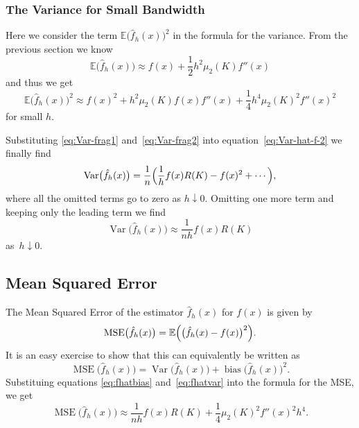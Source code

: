 \documentclass[
  a4paper,
]{article}
\theoremstyle{definition}
\theoremstyle{definition}
\theoremstyle{definition}
\theoremstyle{definition}
\theoremstyle{remark}
\begin{document}
\hypertarget{the-variance-for-small-bandwidth}{%
\subsubsection{The Variance for Small Bandwidth}\label{the-variance-for-small-bandwidth}}

Here we consider the term \(\mathbb{E}\bigl( \hat f_h(x) \bigr)^2\) in the formula
for the variance. From the previous section we know
\begin{equation*}
    \mathbb{E}\bigl( \hat f_h(x) \bigr)
    \approx f(x) + \frac12 h^2 \mu_2(K) f''(x)
\end{equation*}
and thus we get
\begin{equation}
    \mathbb{E}\bigl( \hat f_h(x) \bigr)^2
    \approx f(x)^2 + h^2 \mu_2(K) f(x) f''(x) + \frac14 h^4 \mu_2(K)^2 f''(x)^2
                             \label{eq:Var-frag2}
\end{equation}
for small \(h\).

Substituting \eqref{eq:Var-frag1} and~\eqref{eq:Var-frag2} into
equation~\eqref{eq:Var-hat-f-2} we finally find
\begin{equation*}
  \mathop{\mathrm{Var}}\bigl( \hat f_h(x) \bigr)
  = \frac{1}{n} \Bigl(
    \frac{1}{h} f(x) R(K)
    - f(x)^2
    + \cdots
   \Bigr),
\end{equation*}
where all the omitted terms go to zero as \(h \downarrow 0\).
Omitting one more term and keeping only the leading term
we find
\begin{equation}
  \mathop{\mathrm{Var}}\bigl( \hat f_h(x) \bigr)
  \approx \frac{1}{nh} f(x) R(K)     \label{eq:fhatvar}
\end{equation}
as~\(h\downarrow 0\).

\hypertarget{mean-squared-error}{%
\subsection{Mean Squared Error}\label{mean-squared-error}}

The Mean Squared Error of the estimator \(\hat f_h(x)\) for \(f(x)\) is given
by
\begin{equation*}
  \mathop{\mathrm{MSE}}\nolimits\bigl( \hat f_h(x) \bigr)
  = \mathbb{E}\Bigl( \bigl( \hat f_h(x) - f(x) \bigr)^2 \Bigr).
\end{equation*}
It is an easy exercise to show that this can equivalently be written as
\begin{equation*}
  \mathop{\mathrm{MSE}}\nolimits\bigl( \hat f_h(x) \bigr)
  = \mathop{\mathrm{Var}}\bigl( \hat f_h(x) \bigr) + \mathop{\mathrm{bias}}\bigl( \hat f_h(x) \bigr)^2.
\end{equation*}
Substituing equations \eqref{eq:fhatbias} and~\eqref{eq:fhatvar} into
the formula for the MSE, we get
\begin{equation}
  \mathop{\mathrm{MSE}}\nolimits\bigl( \hat f_h(x) \bigr)
  \approx \frac{1}{nh} f(x) R(K) + \frac14 \mu_2(K)^2 f''(x)^2 h^4.
                           \label{eq:f-hat-MSE}
\end{equation}
\end{document}
